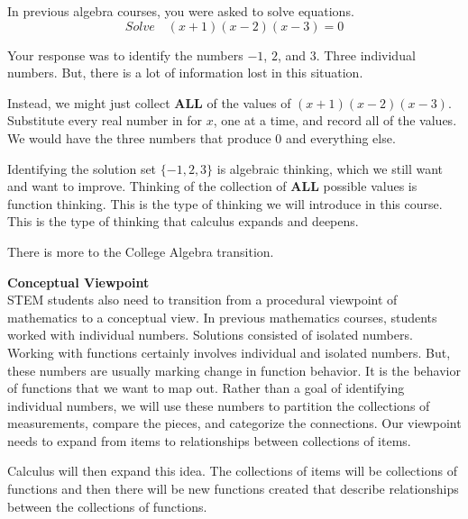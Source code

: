 \documentclass{ximera}
\begin{document}
\begin{idea}
In previous algebra courses, you were asked to solve equations.
\[
Solve \quad (x+1)(x-2)(x-3) = 0
\]

Your response was to identify the numbers $-1$, $2$, and $3$. Three individual numbers. But, there is a lot of information lost in this situation.

Instead, we might just collect \textbf{ALL} of the values of $(x+1)(x-2)(x-3)$.  Substitute every real number in for $x$, one at a time, and record all of the values. We would have the three numbers that produce $0$ and everything else.

Identifying the solution set $\{ -1, 2, 3 \}$ is algebraic thinking, which we still want and want to improve.  Thinking of the collection of \textbf{ALL} possible values is function thinking.  This is the type of thinking we will introduce in this course.  This is the type of thinking that calculus expands and deepens.

\end{idea}  

\smallskip
There is more to the College Algebra transition.








\textbf{Conceptual Viewpoint} \\
STEM students also need to transition from a procedural viewpoint of mathematics to a conceptual view. In previous mathematics courses, students worked with individual numbers. Solutions consisted of isolated numbers. Working with functions certainly involves individual and isolated numbers. But, these numbers are usually marking change in function behavior. It is the behavior of functions that we want to map out. Rather than a goal of identifying individual numbers, we will use these numbers to partition the collections of measurements, compare the pieces, and categorize the connections. Our viewpoint needs to expand from items to relationships between collections of items.

Calculus will then expand this idea.  The collections of items will be collections of functions and then there will be new functions created that describe relationships between the collections of functions.
\end{document}
